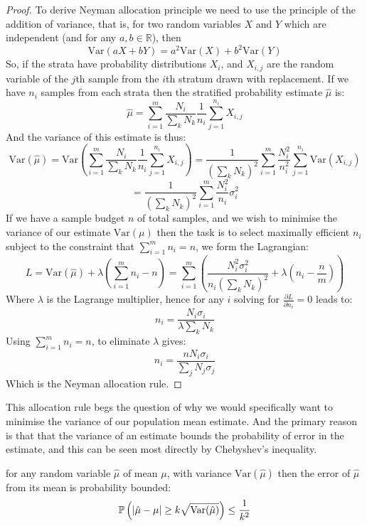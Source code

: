 \begin{proof}
To derive Neyman allocation principle we need to use the principle of the addition of variance, that is, for two random variables $X$ and $Y$ which are independent (and for any $a,b\in \mathbb{R}$), then $$\text{Var}(aX+bY) = a^2\text{Var}(X)+b^2\text{Var}(Y)$$
So, if the strata have probability distributions $X_i$, and $X_{i,j}$ are the random variable of the $j$th sample from the $i$th stratum drawn with replacement. If we have $n_i$ samples from each strata then the stratified probability estimate $\hat{\mu}$ is:
$$ \hat{\mu} = \sum_{i=1}^m\frac{N_i}{\sum_kN_k}\frac{1}{n_i}\sum_{j=1}^{n_i}X_{i,j} $$
And the variance of this estimate is thus:
$$ \text{Var}(\hat{\mu}) = \text{Var}\left(\sum_{i=1}^m\frac{N_i}{\sum_kN_k}\frac{1}{n_i}\sum_{j=1}^{n_i}X_{i,j}\right) = \frac{1}{\left(\sum_kN_k\right)^2}\sum_{i=1}^m\frac{N_i^2}{n_i^2}\sum_{j=1}^{n_i}\text{Var}(X_{i,j})$$
\begin{equation}\label{eq:variance_decomposition_for_strata_mean}= \frac{1}{\left(\sum_kN_k\right)^2} \sum_{i=1}^m\frac{N_i^2}{n_i}\sigma_i^2 \end{equation}
If we have a sample budget $n$ of total samples, and we wish to minimise the variance of our estimate $\text{Var}(\mu)$ then the task is to select maximally efficient $n_i$ subject to the constraint that $\sum_{i=1}^m n_i = n$, we form the Lagrangian:
$$L = \text{Var}(\hat{\mu}) + \lambda\left(\sum_{i=1}^mn_i-n\right) = \sum_{i=1}^m\left(\frac{N_i^2\sigma_i^2}{n_i\left(\sum_kN_k\right)^2} + \lambda \left(n_i-\frac{n}{m}\right)\right)$$
Where $\lambda$ is the Lagrange multiplier, hence for any $i$ solving for $\frac{\partial L}{\partial n_i}=0$ leads to:
$$n_i = \frac{N_i\sigma_i}{\lambda\sum_kN_k}$$
Using $\sum_{i=1}^m n_i = n$, to eliminate $\lambda$ gives:
$$n_i = \frac{nN_i\sigma_i}{\sum_jN_j\sigma_j}$$
Which is the Neyman allocation rule.
\end{proof}

This allocation rule begs the question of why we would specifically want to minimise the variance of our population mean estimate.
And the primary reason is that that the variance of an estimate bounds the probability of error in the estimate, and this can be seen most directly by Chebyshev's inequality.

\begin{theorem}\label{thm:chebyshevs}
for any random variable $\hat{\mu}$ of mean $\mu$, with variance $\text{Var}(\hat{\mu})$ then the error of $\hat{\mu}$ from its mean is probability bounded:
$$ \operatorname{\mathbb{P}}\left(|\hat{\mu}-\mu|\ge k\sqrt{\text{Var}(\hat{\mu})}\right)\le\frac{1}{k^2} $$
\end{theorem}

